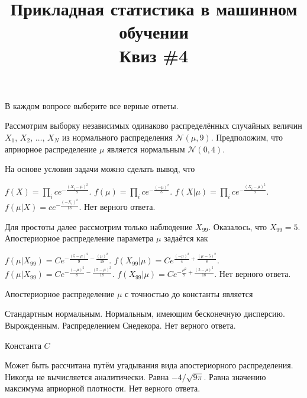 \documentclass[10pt, a4paper]{exam}
\title{{\normalsize Прикладная статистика в машинном обучении} \\ \vspace{0.5em} Квиз \#4}
\author{\rule{15cm}{0.4pt}}
\begin{document}
	
	\maketitle
	
	\begin{center}
		В каждом вопросе выберите все верные ответы.
	\end{center}
	
	Рассмотрим выборку независимых одинаково распределённых случайных величин $X_1$, $X_2$, $\ldots$, $X_N$ из нормального распределения $\mathcal{N}(\mu, 9)$. Предположим, что априорное распределение $\mu$ является нормальным $\mathcal{N}(0, 4)$.
	
	\begin{questions}
		\question На основе условия задачи можно сделать вывод, что
		\begin{choices}
			\choice $f(X) = \prod_i ce^{-\frac{(X_i - \mu)^2}{9}}$.
			\choice $f(\mu) = \prod_i ce^{-\frac{(-\mu)^2}{8}}$.
			\choice $f(X | \mu) = \prod_i ce^{-\frac{(X_i - \mu)^2}{9}}$.
			\choice $f(\mu | X) = ce^{-\frac{(- X_i)^2}{18}}$.
			\choice Нет верного ответа.
		\end{choices}
	
		\question Для простоты далее рассмотрим только наблюдение $X_{99}$. Оказалось, что $X_{99} = 5$. Апостериорное распределение параметра $\mu$ задаётся как
		\begin{choices}
			\choice $f(\mu | X_{99}) = Ce^{-\frac{(5 - \mu)^2}{9} - \frac{(\mu)^2}{18}}$.
			\choice $f( X_{99} | \mu) = Ce^{\frac{(- \mu)^2}{4} + \frac{(\mu - 5)^2}{8}}$.
			\choice $f(\mu | X_{99}) = Ce^{-\frac{(- \mu)^2}{8} - \frac{(5 - \mu)^2}{18}}$.
			\choice $f(X_{99} | \mu) = Ce^{-\frac{\mu^2}{9} + \frac{(5 - \mu)^2}{18}}$.
			\choice Нет верного ответа.
		\end{choices}
	
		\question Апостериорное распределение $\mu$ с точностью до константы является 
		\begin{choices}
			\choice Стандартным нормальным.
			\choice Нормальным, имеющим бесконечную дисперсию.
			\choice Вырожденным.
			\choice Распределением Снедекора.
			\choice Нет верного ответа.
		\end{choices}
		
		\question Константа $C$
		\begin{choices}
			\choice Может быть рассчитана путём угадывания вида апостериорного распределения.
			\choice Никогда не вычисляется аналитически.
			\choice Равна $-4 / \sqrt{9\pi}$.
			\choice Равна значению максимума априорной плотности.
			\choice Нет верного ответа.
		\end{choices}
	

\end{questions}
\end{document}
